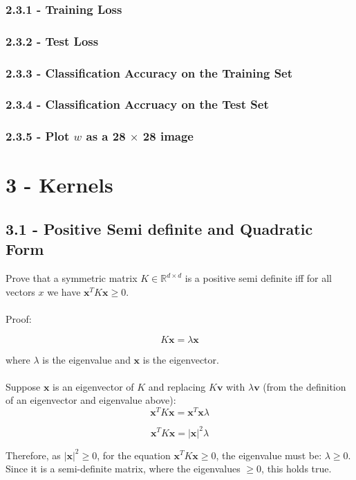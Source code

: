 \documentclass[10pt]{article}
\begin{document}
\subsubsection{2.3.1 - Training Loss}
\subsubsection{2.3.2 - Test Loss}
\subsubsection{2.3.3 - Classification Accuracy on the Training Set}
\subsubsection{2.3.4 - Classification Accruacy on the Test Set}
\subsubsection{2.3.5 - Plot \textbf{$w$} as a 28 $\times $ 28 image }


\section{3 - Kernels}
\subsection{3.1 - Positive Semi definite and Quadratic Form}

Prove that a symmetric matrix $K \in \mathbb{R}^{d \times d} $ is a positive semi definite iff for all vectors $x$ we have $\textbf{x}^{T}K\textbf{x} \geq 0$.
\\ \\
Proof: 

\[
K\textbf{x} = \lambda \textbf{x}
\]

where $\lambda$ is the eigenvalue and $\textbf{x}$ is the eigenvector. 
\\ \\
Suppose $\textbf{x}$ is an eigenvector of $K$ and replacing $K\textbf{v}$ with $\lambda \textbf{v}$ (from the definition of an eigenvector and eigenvalue above):
\[
\textbf{x}^{T}K\textbf{x} = \textbf{x}^{T} \textbf{x} \lambda
\]

\[
\textbf{x}^{T}K\textbf{x} = |\textbf{x}|^{2} \lambda
\]

Therefore, as $|\textbf{x}|^{2} \geq 0$, for the equation $\textbf{x}^{T}K\textbf{x} \geq 0$, the eigenvalue must be: $\lambda \geq 0$. Since it is a semi-definite matrix, where the eigenvalues $\geq 0$, this holds true.  
\end{document}
